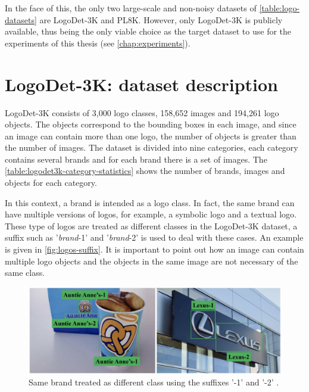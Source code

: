 In the face of this, the only two large-scale and non-noisy datasets of \autoref{table:logo-datasets} are LogoDet-3K and PL8K. However, only LogoDet-3K is publicly available, thus being the only viable choice as the target dataset to use for the experiments of this thesis (see \autoref{chap:experiments}).


\section{LogoDet-3K: dataset description}
\label{sec:logodet-desc}
LogoDet-3K consists of 3,000 logo classes,
158,652 images and 194,261 logo objects. The objects correspond to the bounding boxes in each image, and since an image can contain more than one logo, the number of objects is greater than the number of images. 
The dataset is divided into nine categories, each category contains several brands and for each brand there is a set of images. The \autoref{table:logodet3k-category-statistics} shows the number of brands, images and objects for each category.

In this context, a brand is intended as a logo class. In fact, the same brand can have multiple versions of logos, for example, a symbolic logo and a textual logo. These type of logos are treated as different classes in the LogoDet-3K dataset, a suffix such as '\textit{brand}-1' and '\textit{brand}-2' is used to deal with these cases. An example is given in \autoref{fig:logos-suffix}.
It is important to point out how an image can contain multiple logo objects and the objects in the same image are not necessary of the same class.


\begin{figure}%
	\centering

    \begin{center}
        \includegraphics[width=\columnwidth]{images/logos-suffix.png}
    \end{center}
	\caption{Same brand treated as different class using the suffixes '-1' and '-2' \cite{wang2022logodet}.}%
	\label{fig:logos-suffix}%
\end{figure}

